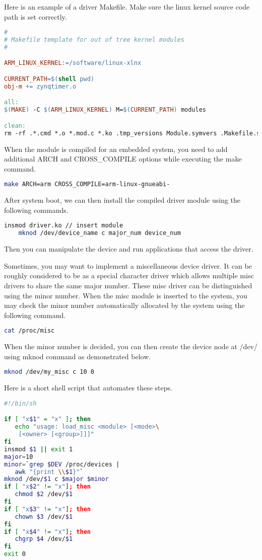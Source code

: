 \documentclass[12pt]{article} %
\begin{document}
Here is an example of a driver Makefile. Make sure the linux kernel source code path is set correctly.
\begin{lstlisting}[language=make]
# 
# Makefile template for out of tree kernel modules
#

ARM_LINUX_KERNEL:=/software/linux-xlnx

CURRENT_PATH=$(shell pwd)
obj-m += zynqtimer.o

all:
$(MAKE) -C $(ARM_LINUX_KERNEL) M=$(CURRENT_PATH) modules

clean:
rm -rf .*.cmd *.o *.mod.c *.ko .tmp_versions Module.symvers .Makefile.swp modules.order
\end{lstlisting}

When the module is compiled for an embedded system, you need to add additional ARCH and CROSS\_COMPILE
options while executing the make command. 
\begin{lstlisting}[language=bash]
    make ARCH=arm CROSS_COMPILE=arm-linux-gnueabi-
\end{lstlisting}

After system boot, we can then install the compiled driver module using the following commands.\
\begin{lstlisting}[language=bash]
    insmod driver.ko // insert module 
    mknod /dev/device_name c major_num device_num
\end{lstlisting}
Then you can manipulate the device and run applications that access the driver.

Sometimes, you may want to implement a miscellaneous device driver. It can be roughly 
considered to be as a special character driver which allows multiple misc drivers to 
share the same major number. These misc driver can be distinguished using the minor number.
When the misc module is inserted to the system, you may check the minor number automatically 
allocated by the system using the following command.

\begin{lstlisting}[language=bash]
    cat /proc/misc
\end{lstlisting}

When the minor number is decided, you can then create the device node at /dev/ using 
mknod command as demonstrated below.
\begin{lstlisting}[language=bash]
    mknod /dev/my_misc c 10 0
\end{lstlisting}

Here is a short shell script that automates these steps.
\begin{lstlisting}[language=bash]
#!/bin/sh

if [ "x$1" = "x" ]; then
   echo "usage: load_misc <module> [<mode>\
    [<owner> [<group>]]]"
fi
insmod $1 || exit 1
major=10
minor=`grep $DEV /proc/devices |
   awk "{print \\$1}"`
mknod /dev/$1 c $major $minor
if [ "x$2" != "x"]; then
   chmod $2 /dev/$1
fi
if [ "x$3" != "x"]; then
   chown $3 /dev/$1
fi
if [ "x$4" != "x"]; then
   chgrp $4 /dev/$1
fi
exit 0
\end{lstlisting}
\end{document}
